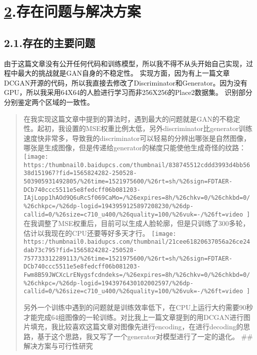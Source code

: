\documentclass{article}
\begin{document}
\section{\href{https://thumbnail0.baidupcs.com/thumbnail/d2a7e6bc47ddbee5b905f6737b6fafd5?fid=1565824282-250528-455106901933423\%26time=1521975600\%26rt=sh\%26sign=FDTAER-DCb740ccc5511e5e8fedcff06b081203-8lC\%252Briz8FLY6AOMwXPpEqdzHrZc\%253D\%26expires=8h\%26chkv=0\%26chkbd=0\%26chkpc=\%26dp-logid=1943732916945143251\%26dp-callid=0\%26size=c710_u400\%26quality=100\%26vuk=-\%26ft=video}{2}.\hspace*{0.5em}存在问题与解决方案}\label{section}%

\subsection{2.1.\hspace*{0.5em}存在的主要问题}\label{section}%

\noindent{}由于这篇文章没有公开任何代码和训练模型，所以我不得不从头开始自己实现，过程中最大的挑战就是GAN自身的不稳定性。
实现方面，因为有上一篇文章DCGAN开源的代码，所以我直接去修改了Discriminator和Generator。因为没有GPU，所以我采用64X64的人脸进行学习而非256X256的Place2数据集。
识别部分分别鉴定两个区域的一致性。%

\begin{quote}%

\noindent{}在我实现这篇文章中提到的算法时，遇到最大的问题就是GAN的不稳定性。起初，我设置的MSE权重比例太低，另外discriminator比generator训练速度快非常多，导致我的discriminator可以轻易的分辨出哪张是自然图像，哪张是生成图像，但是传递给generator的梯度只能使他生成奇怪的纹路：
\texttt{[image: https:/thumbnail0.baidupcs.com/thumbnail/838745512cddd3993d4bb5638d151967?fid=1565824282-250528-503905931492805/\%26time=1521975600/\%26rt=sh/\%26sign=FDTAER-DCb740ccc5511e5e8fedcff06b081203-IAjLopp1hAOd9Q6uRcSf069CaMo=/\%26expires=8h/\%26chkv=0/\%26chkbd=0/\%26chkpc=/\%26dp-logid=1943959125897208230/\%26dp-callid=0/\%26size=c710\_u400/\%26quality=100/\%26vuk=-/\%26ft=video
]}{}
在我调整了MSE权重后，目前可以生成人脸轮廓，但是只训练了300多轮，估计以我现在的CPU还要等好多天才行。
\texttt{[image: https:/thumbnail0.baidupcs.com/thumbnail/21cee61820637056a26ce24dab73c795?fid=1565824282-250528-757733312289113/\%26time=1521975600/\%26rt=sh/\%26sign=FDTAER-DCb740ccc5511e5e8fedcff06b081203-Fwm8B59JWCXcLrENygsfcdndeks=/\%26expires=8h/\%26chkv=0/\%26chkbd=0/\%26chkpc=/\%26dp-logid=1943976430102002597/\%26dp-callid=0/\%26size=c710\_u400/\%26quality=100/\%26vuk=-/\%26ft=video
]}{}%

另外一个训练中遇到的问题就是训练效率低下，在CPU上运行大约需要90秒才能完成64组图像的一轮训练。对比我上一篇文章提到的用DCGAN进行图片填充，我比较喜欢这篇文章对图像先进行encoding，在进行decoding的思路，基于这个思路，我又写了一个generator对模型进行了一定的退化。
\#\#解决方案与可行性研究%
\end{quote}%
\end{document}
